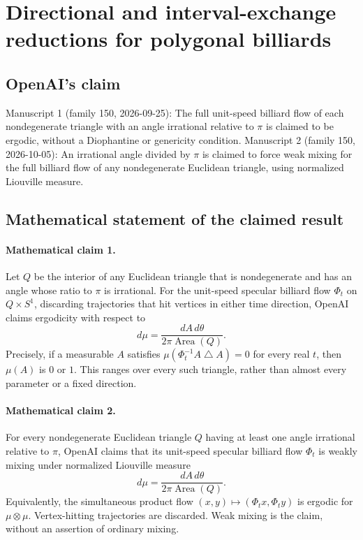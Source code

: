 \documentclass[11pt]{article}
\begin{document}
\section*{Directional and interval-exchange reductions for polygonal billiards}

\subsection{OpenAI's claim}
Manuscript 1 (family 150, 2026-09-25): The full unit-speed billiard flow of each nondegenerate triangle with an angle irrational relative to $\pi$ is claimed to be ergodic, without a Diophantine or genericity condition. Manuscript 2 (family 150, 2026-10-05): An irrational angle divided by $\pi$ is claimed to force weak mixing for the full billiard flow of any nondegenerate Euclidean triangle, using normalized Liouville measure.

\subsection{Mathematical statement of the claimed result}
\paragraph{Mathematical claim 1.} Let $Q$ be the interior of any Euclidean triangle that is nondegenerate and has an angle whose ratio to $\pi$ is irrational. For the unit-speed specular billiard flow $\Phi_t$ on $Q\times S^1$, discarding trajectories that hit vertices in either time direction, OpenAI claims ergodicity with respect to
\[
d\mu=\frac{dA\,d\theta}{2\pi\operatorname{Area}(Q)}.
\]
Precisely, if a measurable $A$ satisfies $\mu(\Phi_t^{-1}A\mathbin{\triangle} A)=0$ for every real $t$, then $\mu(A)$ is $0$ or $1$. This ranges over every such triangle, rather than almost every parameter or a fixed direction.

\paragraph{Mathematical claim 2.} For every nondegenerate Euclidean triangle $Q$ having at least one angle irrational relative to $\pi$, OpenAI claims that its unit-speed specular billiard flow $\Phi_t$ is weakly mixing under normalized Liouville measure
\[
d\mu=\frac{dA\,d\theta}{2\pi\operatorname{Area}(Q)}.
\]
Equivalently, the simultaneous product flow $(x,y)\mapsto(\Phi_tx,\Phi_ty)$ is ergodic for $\mu\otimes\mu$. Vertex-hitting trajectories are discarded. Weak mixing is the claim, without an assertion of ordinary mixing.
\end{document}
